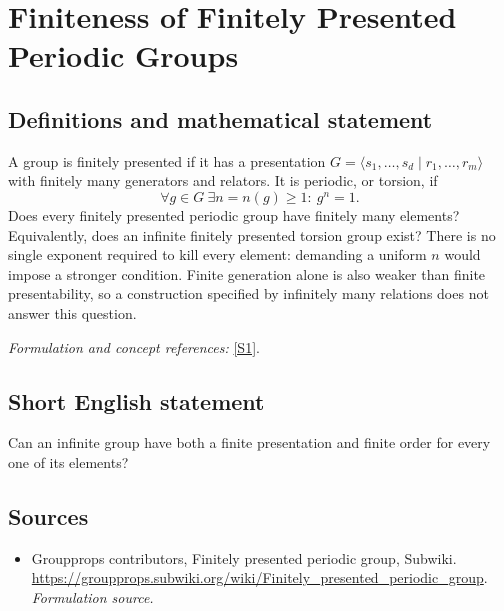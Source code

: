 \documentclass[11pt]{article}
\begin{document}
\section*{\texorpdfstring{Finiteness of Finitely Presented Periodic Groups}{Finiteness of Finitely Presented Periodic Groups}}\label{319}
\subsection{Definitions and mathematical statement}
A group is finitely presented if it has a presentation $G=\langle s_1,\ldots,s_d\mid r_1,\ldots,r_m\rangle$ with finitely many generators and relators. It is periodic, or torsion, if
\[
 \forall g\in G\ \exists n=n(g)\ge1:\ g^n=1.
\]
Does every finitely presented periodic group have finitely many elements? Equivalently, does an infinite finitely presented torsion group exist? There is no single exponent required to kill every element: demanding a uniform $n$ would impose a stronger condition. Finite generation alone is also weaker than finite presentability, so a construction specified by infinitely many relations does not answer this question.
\par\smallskip\textit{Formulation and concept references:} \href{https://groupprops.subwiki.org/wiki/Finitely_presented_periodic_group}{[S1]}.

\subsection{Short English statement}
Can an infinite group have both a finite presentation and finite order for every one of its elements?
\subsection{Sources}
\begin{itemize}
\item[S1]Groupprops contributors, Finitely presented periodic group, Subwiki.
\url{https://groupprops.subwiki.org/wiki/Finitely_presented_periodic_group}.
\textit{Formulation source.}
\end{itemize}
\end{document}
